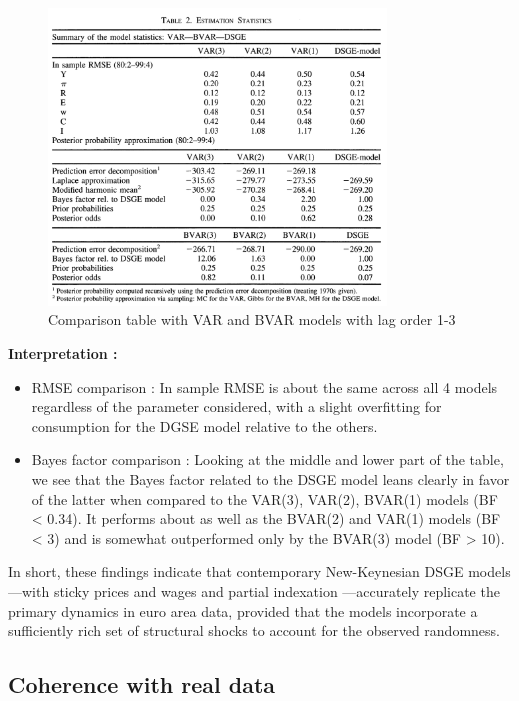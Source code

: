 \documentclass{article}
\begin{document}
\begin{figure}[H]  
    \centering  
    \includegraphics[width=0.8\textwidth]{Pictures/Screenshot 2025-03-26 at 9.08.59 PM.png}  
    \caption{Comparison table with VAR and BVAR models with lag order 1-3}  
    \label{fig:myimage}  
\end{figure}  

\textbf{Interpretation :}
\begin{itemize}
    \item RMSE comparison : In sample RMSE is about the same across all 4 models regardless of the parameter considered, with a slight overfitting for consumption for the DGSE model relative to the others.  
    \item Bayes factor comparison : Looking at the middle and lower part of the table, we see that the Bayes factor related to the DSGE model leans clearly in favor of the latter when compared to the VAR(3), VAR(2), BVAR(1) models (BF < 0.34). It performs about as well as the BVAR(2) and VAR(1) models (BF < 3) and is somewhat outperformed only by the BVAR(3) model (BF > 10).
\end{itemize}

In short, these findings indicate that contemporary New-Keynesian DSGE models—with sticky prices and wages and partial indexation —accurately replicate the primary dynamics in euro area data, provided that the models incorporate a sufficiently rich set of structural shocks to account for the observed randomness.


\subsection{Coherence with real data}
\end{document}
